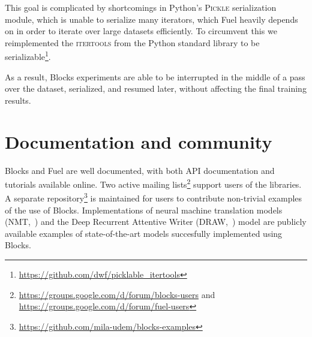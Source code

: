\documentclass[twoside,11pt]{article}
\begin{document}
This goal is complicated by shortcomings in Python's \textsc{Pickle}
serialization module, which is unable to serialize many iterators, which Fuel
heavily depends on in order to iterate over large datasets efficiently. To
circumvent this we reimplemented the \textsc{itertools} from the Python
standard library to be
serializable\footnote{\url{https://github.com/dwf/picklable_itertools}}.

As a result, Blocks experiments are able to be interrupted in the middle of a
pass over the dataset, serialized, and resumed later, without affecting the
final training results.

\section{Documentation and community}

Blocks and Fuel are well documented, with both API documentation and tutorials
available online. Two active mailing
lists\footnote{\url{https://groups.google.com/d/forum/blocks-users} and
\url{https://groups.google.com/d/forum/fuel-users}} support users of the
libraries. A separate
repository\footnote{\url{https://github.com/mila-udem/blocks-examples}} is
maintained for users to contribute non-trivial examples of the use of Blocks.
Implementations of neural machine translation models
(NMT,~\cite{bahdanau2015neural}) and the Deep Recurrent Attentive Writer
(DRAW,~\cite{gregor2015draw}) model are publicly available examples of
state-of-the-art models succesfully implemented using Blocks.



\end{document}
